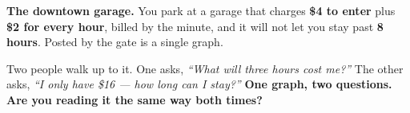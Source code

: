 \documentclass[10pt]{article}
\begin{document}
\vspace{0.10in}

\boxguard[12]
\begin{hookbox}
\small
\textbf{The downtown garage.} You park at a garage that charges \textbf{\$4 to enter} plus
\textbf{\$2 for every hour}, billed by the minute, and it will not let you stay past
\textbf{8 hours}. Posted by the gate is a single graph.

Two people walk up to it. One asks, \emph{``What will three hours cost me?''} The other asks,
\emph{``I only have \$16 --- how long can I stay?''} \textbf{One graph, two questions. Are you
reading it the same way both times?}

\\
\\
\end{hookbox}

\vspace{0.10in}
\end{document}
